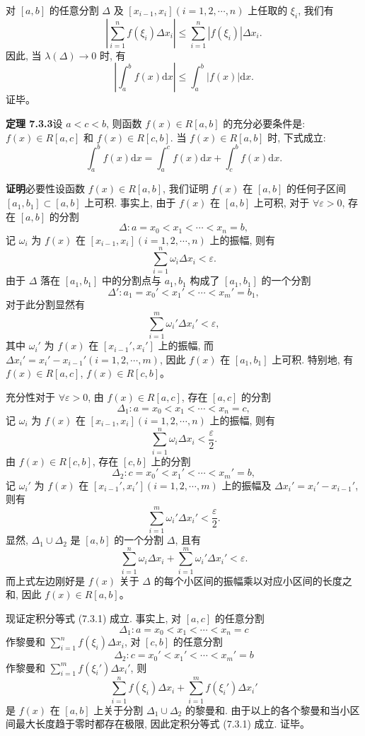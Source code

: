 \documentclass[UTF8, 12pt, fontset=fandol, oneside]{ctexart}
\begin{document}
对 $[a,b]$ 的任意分割 $\Delta$ 及 $[x_{i-1},x_i](i=1,2,\cdots,n)$ 上任取的 $\xi_i$, 我们有
\[
  \left|\sum_{i=1}^n f(\xi_i)\Delta x_i\right|
  \leq \sum_{i=1}^n |f(\xi_i)|\Delta x_i.
\]
因此, 当 $\lambda(\Delta)\to0$ 时, 有
\[
  \left|\int_a^b f(x)\mathrm dx\right|\leq \int_a^b |f(x)|\mathrm dx.
\]
证毕。

\noindent\textbf{定理 7.3.3}\quad 设 $a<c<b$, 则函数 $f(x)\in R[a,b]$ 的充分必要条件是: $f(x)\in R[a,c]$ 和 $f(x)\in R[c,b]$. 当 $f(x)\in R[a,b]$ 时, 下式成立:
\begin{equation}
  \int_a^b f(x)\mathrm dx=\int_a^c f(x)\mathrm dx+\int_c^b f(x)\mathrm dx.
  \tag{7.3.1}
\end{equation}

\noindent\textbf{证明}\quad 必要性\quad 设函数 $f(x)\in R[a,b]$, 我们证明 $f(x)$ 在 $[a,b]$ 的任何子区间 $[a_1,b_1]\subset[a,b]$ 上可积. 事实上, 由于 $f(x)$ 在 $[a,b]$ 上可积, 对于 $\forall\varepsilon>0$, 存在 $[a,b]$ 的分割
\[
  \Delta:a=x_0<x_1<\cdots<x_n=b,
\]
记 $\omega_i$ 为 $f(x)$ 在 $[x_{i-1},x_i](i=1,2,\cdots,n)$ 上的振幅, 则有
\[
  \sum_{i=1}^n \omega_i\Delta x_i<\varepsilon.
\]
由于 $\Delta$ 落在 $[a_1,b_1]$ 中的分割点与 $a_1,b_1$ 构成了 $[a_1,b_1]$ 的一个分割
\[
  \Delta':a_1=x_0'<x_1'<\cdots<x_m'=b_1,
\]
对于此分割显然有
\[
  \sum_{i=1}^m \omega_i'\Delta x_i'<\varepsilon,
\]
其中 $\omega_i'$ 为 $f(x)$ 在 $[x_{i-1}',x_i']$ 上的振幅, 而 $\Delta x_i'=x_i'-x_{i-1}'(i=1,2,\cdots,m)$, 因此 $f(x)$ 在 $[a_1,b_1]$ 上可积. 特别地, 有 $f(x)\in R[a,c]$, $f(x)\in R[c,b]$。

充分性\quad 对于 $\forall\varepsilon>0$, 由 $f(x)\in R[a,c]$, 存在 $[a,c]$ 的分割
\[
  \Delta_1:a=x_0<x_1<\cdots<x_n=c,
\]
记 $\omega_i$ 为 $f(x)$ 在 $[x_{i-1},x_i](i=1,2,\cdots,n)$ 上的振幅, 则有
\[
  \sum_{i=1}^n\omega_i\Delta x_i<\frac{\varepsilon}{2}.
\]
由 $f(x)\in R[c,b]$, 存在 $[c,b]$ 上的分割
\[
  \Delta_2:c=x_0'<x_1'<\cdots<x_m'=b,
\]
记 $\omega_i'$ 为 $f(x)$ 在 $[x_{i-1}',x_i'](i=1,2,\cdots,m)$ 上的振幅及 $\Delta x_i'=x_i'-x_{i-1}'$, 则有
\[
  \sum_{i=1}^m\omega_i'\Delta x_i'<\frac{\varepsilon}{2}.
\]
显然, $\Delta_1\cup\Delta_2$ 是 $[a,b]$ 的一个分割 $\Delta$, 且有
\[
  \sum_{i=1}^n\omega_i\Delta x_i+\sum_{i=1}^m\omega_i'\Delta x_i'<\varepsilon.
\]
而上式左边刚好是 $f(x)$ 关于 $\Delta$ 的每个小区间的振幅乘以对应小区间的长度之和, 因此 $f(x)\in R[a,b]$。

现证定积分等式 (7.3.1) 成立. 事实上, 对 $[a,c]$ 的任意分割
\[
  \Delta_1:a=x_0<x_1<\cdots<x_n=c
\]
作黎曼和 $\sum_{i=1}^n f(\xi_i)\Delta x_i$, 对 $[c,b]$ 的任意分割
\[
  \Delta_2:c=x_0'<x_1'<\cdots<x_m'=b
\]
作黎曼和 $\sum_{i=1}^m f(\xi_i')\Delta x_i'$, 则
\[
  \sum_{i=1}^n f(\xi_i)\Delta x_i+\sum_{i=1}^m f(\xi_i')\Delta x_i'
\]
是 $f(x)$ 在 $[a,b]$ 上关于分割 $\Delta_1\cup\Delta_2$ 的黎曼和. 由于以上的各个黎曼和当小区间最大长度趋于零时都存在极限, 因此定积分等式 (7.3.1) 成立. 证毕。
\end{document}

